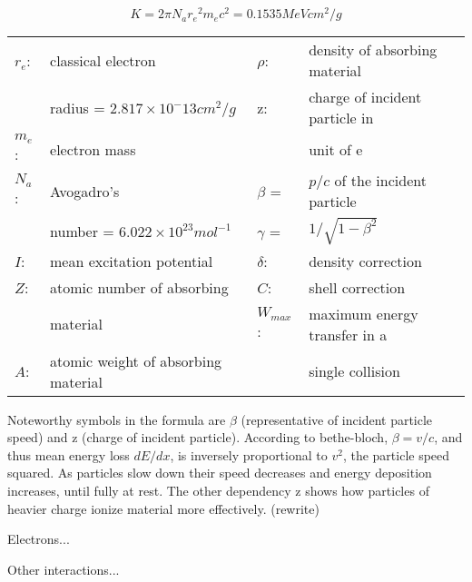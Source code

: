 \begin{equation}
  K = 2\pi N_a {r_{e}}^{2} m_e c^2 = 0.1535 MeVcm^2/g
\end{equation}

\begin{table}[H]
\rmfamily
\centering
\begin{tabular}{llll}
$r_{e}$: & classical electron & $\rho$: & density of absorbing material \\
 & radius = $2.817\times10^-13cm^2/g$ & z: & charge of incident particle in \\
$m_{e}$: & electron mass &  & unit of e \\
$N_{a}$: & Avogadro's & $\beta$ = & $p/c$ of the incident particle \\
 & number = $6.022 \times 10^{23}mol^{-1}$ & $\gamma$ = & $1/\sqrt{1-\beta^2}$ \\
$I$: & mean excitation potential & $\delta$: & density correction \\
$Z$: & atomic number of absorbing & $C$: & shell correction \\
 & material & $W_{max}$: & maximum energy transfer in a \\
$A$: & atomic weight of absorbing material &  & single collision \\

\end{tabular}
\end{table}

Noteworthy symbols in the formula are $\beta$ (representative of incident particle speed) and z (charge of incident particle).
According to bethe-bloch, $\beta = v/c$, and thus mean energy loss $dE/dx$, is inversely proportional to $v^2$, the particle speed squared. As particles slow down their speed decreases and energy deposition increases, until fully at rest. The other dependency z shows how particles of heavier charge ionize material more effectively. (rewrite)


Electrons...

Other interactions...

